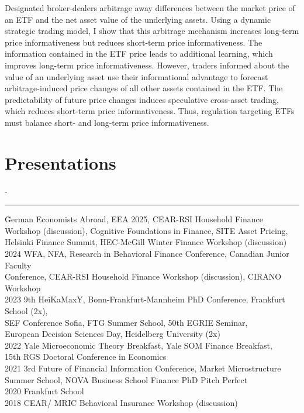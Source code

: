 \documentclass{res}
\newcommand{\sectionline}{	\vspace{-8pt}
	{\parindent-\sectionwidth \rule{\resumewidth}{0.4pt}} }
\newenvironment{nstabbing}
  {\setlength{\topsep}{-\parskip}%
   \setlength{\partopsep}{0pt}%
   \tabbing}
  {\endtabbing}
\begin{document}
\begin{resume}
    Designated broker-dealers arbitrage away differences between the market price of an ETF and the net asset value of the underlying assets. Using a dynamic strategic trading model, I show that this arbitrage mechanism increases long-term price informativeness but reduces short-term price informativeness. The information contained in the ETF price leads to additional learning, which improves long-term price informativeness. However, traders informed about the value of an underlying asset use their informational advantage to forecast arbitrage-induced price changes of all other assets contained in the ETF. The predictability of future price changes induces speculative cross-asset trading, which reduces short-term price informativeness. Thus, regulation targeting ETFs must balance short- and long-term price informativeness.
    
\section{Presentations} 	
	\sectionline
	\vspace{-3ex}
    \begin{nstabbing}
	2025 \qquad \qquad \qquad \= German Economists Abroad, EEA 2025, CEAR-RSI Household Finance \\
	 \>  Workshop (discussion), Cognitive Foundations in Finance,  SITE Asset Pricing, \\ 
	 \> Helsinki Finance Summit, HEC-McGill Winter Finance Workshop (discussion)\\[0.5ex]
	2024 \> WFA, NFA, Research in Behavioral Finance Conference, Canadian Junior Faculty \\
	\> 	Conference, CEAR-RSI Household Finance Workshop (discussion), 
	CIRANO Workshop \\[0.5ex]
	2023 \> 9th HeiKaMaxY, Bonn-Frankfurt-Mannheim PhD Conference, Frankfurt School (2x), \\
	\>  SEF Conference Sofia, FTG Summer School, 50th EGRIE Seminar,\\
	\>  European Decision Sciences Day, Heidelberg University (2x) \\[0.5ex]
    2022 \> Yale Microeconomic Theory Breakfast, Yale SOM Finance Breakfast, \\
    \> 15th RGS Doctoral Conference in Economics \\[0.5ex]
    2021 \> 3rd Future of Financial Information Conference, Market Microstructure \\
    \> Summer School, NOVA Business School Finance PhD Pitch Perfect \\[0.5ex]
    2020 \> Frankfurt School \\[0.5ex]
	2018 \> CEAR/ MRIC Behavioral Insurance Workshop (discussion)
    \end{nstabbing}
    

\end{resume}
\end{document}
